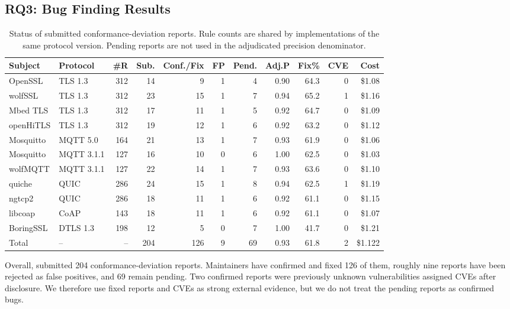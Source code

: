 \subsection{RQ3: Bug Finding Results}

\begin{table}[t]
\centering
\caption{Status of submitted conformance-deviation reports. Rule counts are
shared by implementations of the same protocol version. Pending reports are not
used in the adjudicated precision denominator.}
\label{tab:verification-results}
\small
\setlength{\tabcolsep}{3.4pt}
\begin{tabular}{llrrrrrrrrr}
\toprule
\textbf{Subject}
& \textbf{Protocol}
& \textbf{\#R}
& \textbf{Sub.}
& \textbf{Conf./Fix}
& \textbf{FP}
& \textbf{Pend.}
& \textbf{Adj.P}
& \textbf{Fix\%}
& \textbf{CVE}
& \textbf{Cost} \\
\midrule
OpenSSL    & TLS 1.3    & 312 & 14 & 9  & 1 & 4 & 0.90 & 64.3 & 0 & \$1.08 \\
wolfSSL    & TLS 1.3    & 312 & 23 & 15 & 1 & 7 & 0.94 & 65.2 & 1 & \$1.16 \\
Mbed TLS   & TLS 1.3    & 312 & 17 & 11 & 1 & 5 & 0.92 & 64.7 & 0 & \$1.09 \\
openHiTLS  & TLS 1.3    & 312 & 19 & 12 & 1 & 6 & 0.92 & 63.2 & 0 & \$1.12 \\
Mosquitto  & MQTT 5.0   & 164 & 21 & 13 & 1 & 7 & 0.93 & 61.9 & 0 & \$1.06 \\
Mosquitto  & MQTT 3.1.1 & 127 & 16 & 10 & 0 & 6 & 1.00 & 62.5 & 0 & \$1.03 \\
wolfMQTT   & MQTT 3.1.1 & 127 & 22 & 14 & 1 & 7 & 0.93 & 63.6 & 0 & \$1.10 \\
quiche     & QUIC       & 286 & 24 & 15 & 1 & 8 & 0.94 & 62.5 & 1 & \$1.19 \\
ngtcp2     & QUIC       & 286 & 18 & 11 & 1 & 6 & 0.92 & 61.1 & 0 & \$1.15 \\
libcoap    & CoAP       & 143 & 18 & 11 & 1 & 6 & 0.92 & 61.1 & 0 & \$1.07 \\
BoringSSL  & DTLS 1.3   & 198 & 12 & 5  & 0 & 7 & 1.00 & 41.7 & 0 & \$1.21 \\
\midrule
Total      & --         & --  & 204 & 126 & 9 & 69 & 0.93 & 61.8 & 2 & \$1.122 \\
\bottomrule
\end{tabular}
\end{table}

Overall, \tool{} submitted 204 conformance-deviation reports. Maintainers have
confirmed and fixed 126 of them, roughly nine reports have been rejected as
false positives, and 69 remain pending. Two confirmed reports were previously
unknown vulnerabilities assigned CVEs after disclosure. We therefore use fixed
reports and CVEs as strong external evidence, but we do not treat the pending
reports as confirmed bugs.

